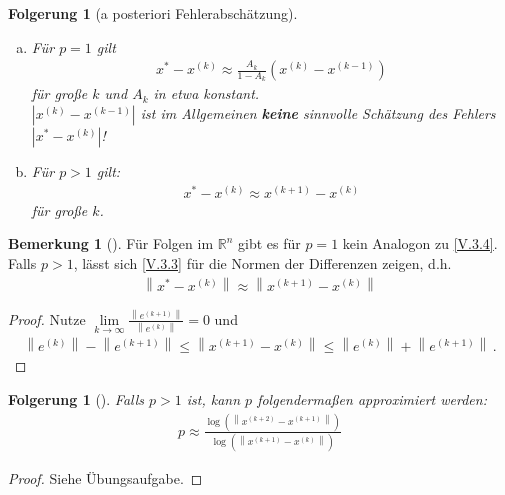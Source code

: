 \documentclass[ngerman,fontsize=11pt, paper=a4, parskip=half, titlepage=true, toc=bib]{scrbook}
\theoremstyle{definition}
\newtheorem{Bem}[Def]{Bemerkung}	%
\theoremstyle{plain}
\newtheorem{Fol}[Def]{Folgerung}
\newcommand{\R}{\mathds{R}}
\newcommand{\nn}[1]{\left\| #1 \right\|}
\newcommand{\subsectione}[1]{\addtocounter{Def}{1}\subsection{#1}}
\newenvironment{Fole}[1][]{ %
  \begin{Fol}[#1]
  }
  {
  \end{Fol}
  \addtocounter{subsection}{1}
}
\newenvironment{Beme}[1][]{ %
  \begin{Bem}[#1]
  }
  {
  \end{Bem}
  \addtocounter{subsection}{1}
}
\begin{document}
\begin{Fole}[a posteriori Fehlerabschätzung]~
  \begin{enumerate}[a)]
  \item Für $p=1$ gilt
    \begin{gather}
      x^{*}-x^{(k)} \approx \frac{A_k}{1-A_k}(x^{(k)}-x^{(k-1)})
      \label{V.3.4}
    \end{gather}
    für große $k$ und $A_k$ in etwa konstant. \\
    $|x^{(k)}-x^{(k-1)}|$ ist im Allgemeinen \textbf{keine} sinnvolle Schätzung
    des Fehlers $|x^{*}-x^{(k)}|$!
  \item Für $p>1$ gilt:
    \begin{gather}
      x^{*}-x^{(k)} \approx x^{(k+1)}-x^{(k)}
      \label{V.3.5}
    \end{gather}
    für große $k$.
  \end{enumerate}
\end{Fole}


\begin{Beme}
  Für Folgen im $\R^n$ gibt es für $p=1$ kein Analogon zu \eqref{V.3.4}.
  Falls $p>1$, lässt sich \eqref{V.3.3} für die Normen der Differenzen zeigen,
  d.h.
  \begin{gather}
    \nn{x^{*}-x^{(k)}} \approx \nn{x^{(k+1)}-x^{(k)}}
    \label{V.3.6}
  \end{gather}
  
  \begin{proof}
    Nutze $\lim\limits_{k\rightarrow\infty} \frac{\nn{e^{(k+1)}}}{\nn{e^{(k)}}} =0$
    und 
    \begin{gather*}
      \nn{e^{(k)}}-\nn{e^{(k+1)}}\leq \nn{x^{(k+1)}-x^{(k)}} \leq \nn{e^{(k)}}+\nn{e^{(k+1)}} \, .
    \end{gather*}
  \end{proof}
\end{Beme}


\begin{Fole}
  Falls $p>1$ ist, kann $p$ folgendermaßen approximiert werden:
  \begin{gather*}
    p \approx \frac{\log(\nn{x^{(k+2)}-x^{(k+1)}})}{\log(\nn{x^{(k+1)}-x^{(k)}})}
  \end{gather*}
\end{Fole}

\begin{proof}
  Siehe Übungsaufgabe.
\end{proof}
\end{document}
